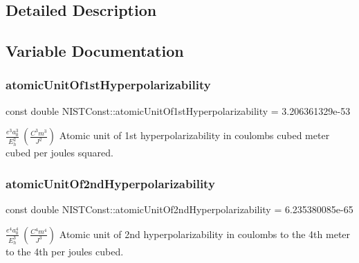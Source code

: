 \subsection{Detailed Description}


\subsection{Variable Documentation}
\mbox{\label{group___n_i_s_t_const-_atomic_unit_gaa43ceaed22f3b69aee64d117cae645fb}} 
\subsubsection{\texorpdfstring{atomic\+Unit\+Of1st\+Hyperpolarizability}{atomicUnitOf1stHyperpolarizability}}
{\footnotesize\ttfamily const double N\+I\+S\+T\+Const\+::atomic\+Unit\+Of1st\+Hyperpolarizability = 3.\+206361329e-\/53}

$\frac{e^3 a_0^3}{E_h^2} \ (\frac{C^3 m^3}{J^2})$ Atomic unit of 1st hyperpolarizability in coulombs cubed meter cubed per joules squared. \mbox{\label{group___n_i_s_t_const-_atomic_unit_ga55b22fa50aa069b98aa1bcb050206a8e}} 
\subsubsection{\texorpdfstring{atomic\+Unit\+Of2nd\+Hyperpolarizability}{atomicUnitOf2ndHyperpolarizability}}
{\footnotesize\ttfamily const double N\+I\+S\+T\+Const\+::atomic\+Unit\+Of2nd\+Hyperpolarizability = 6.\+235380085e-\/65}

$\frac{e^4 a_0^4}{E_h^3} \ (\frac{C^4 m^4}{J^3})$ Atomic unit of 2nd hyperpolarizability in coulombs to the 4th meter to the 4th per joules cubed. \mbox{\label{group___n_i_s_t_const-_atomic_unit_ga6685e215d87395646fc18e2efa30d7a0}} 
